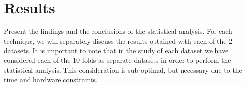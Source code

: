 \section{Results}\label{sec:results}
Present the findings and the conclusions of the statistical analysis. For each technique, we will separately discuss the results obtained with each of the 2 datasets. It is important to note that in the study of each dataset we have considered each of the 10 folds as separate datasets in order to perform the statistical analysis. This consideration is sub-optimal, but necessary due to the time and hardware constraints.










